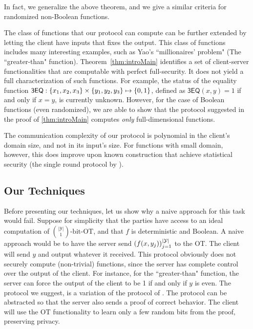 \documentclass{llncs}
\newcommand{\bOT}[2]{\binom{#2}{#1}\text{-bit-OT}}
\newcommand{\Y}{\mathcal{Y}}
\begin{document}
In fact, we generalize the above theorem, and we give a similar criteria for randomized non-Boolean functions.

The class of functions that our protocol can compute can be further extended by letting the client have inputs that fixes the output. This class of functions includes many interesting examples, such as Yao's ``millionaires’ problem" (The ``greater-than" function). Theorem~\ref{thm:introMain} identifies a set of client-server functionalities that are computable with perfect full-security. It does not yield a full characterization of such functions. For example, the status of the equality function $\mathsf{3EQ}:\left\{x_1,x_2,x_3\right\}\times\left\{y_1,y_2,y_3\right\}\mapsto\{0,1\}$, defined as $\mathsf{3EQ}(x,y)=1$ if and only if $x=y$, is currently unknown. However, for the case of Boolean functions (even randomized), we are able to show that the protocol suggested in the proof of \cref{thm:introMain} computes \emph{only} full-dimensional functions.

The communication complexity of our protocol is polynomial in the client's domain size, and not in its input's size. For functions with small domain, however, this does improve upon known construction that achieve statistical security (\eg the single round protocol by \citet{IKOPS11}).


\subsection{Our Techniques}
Before presenting our techniques, let us show why a naive approach for this task would fail. Suppose for simplicity that the parties have access to an ideal computation of $\bOT{1}{|\Y|}$, and that $f$ is deterministic and Boolean. A naive approach would be to have the server send $\vect{f(x,y_j)}_{j=1}^{|\Y|}$ to the OT. The client will send $y$ and output whatever it received. This protocol obviously does not securely compute (non-trivial) functions, since the server has complete control over the output of the client. For instance, for the ``greater-than" function, the server can force the output of the client to be 1 if and only if $y$ is even. The protocol we suggest, is a variation of the protocol of \citet{IKOPS11}. The protocol can be abstracted so that the server also sends a proof of correct behavior. The client will use the OT functionality to learn only a few random bits from the proof, preserving privacy.
\end{document}
